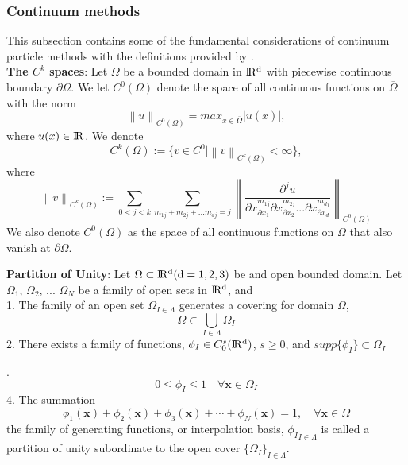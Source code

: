 \documentclass[a4paper,12pt,openany]{book}
\newcommand{\R}{\rm I\!R}
\newcommand{\norm}[1]{\left\lVert#1\right\rVert}
\theoremstyle{break}
\begin{document}
\subsubsection{Continuum methods}
This subsection contains some of the fundamental considerations of continuum particle methods with the definitions provided by \cite{Shaofan2007}. \\

\textbf{The $C^k$ spaces}: Let $\Omega$ be a bounded domain in $\R^d$ with piecewise continuous boundary $\partial\Omega$. We let $C^0(\Omega)$ denote the space of all continuous functions on $\overline{\Omega}$ with the norm
\begin{equation}
\norm{u}_{C^0(\Omega)}=max_{x\in\overline{\Omega}}|u(x)|,
\end{equation}
where $u(x)\in\R$. We denote
\begin{equation}
C^k(\Omega):=\{v\in C^0\vert\norm{v}_{C^k (\Omega)}<\infty\},
\end{equation}
where
\begin{equation}
\norm{v}_{C^k (\Omega)}:=\sum_{0<j<k}\sum_{m_{1j}+m_{2j}+...m_{dj}=j}\norm{\frac{\partial^j u}{\partial x^{m_{1j}}_{\partial x_1}\partial x^{m_{2j}}_{\partial x_2}...\partial x^{m_{dj}}_{\partial x_d}}}_{C^0(\Omega)}
\end{equation}
We also denote $C^0(\Omega)$ as the space of all continuous functions on $\Omega$ that also vanish at $\partial\Omega$.

\textbf{Partition of Unity}: Let $\Omega \subset \R^d(d=1,2,3)$ be and open bounded domain. Let $\Omega_1$, $\Omega_2$, ... $\Omega_{N}$ be a family of open sets in $\R^d$, and \\
1. The family of an open set ${\Omega}_{I\in\Lambda}$ generates a covering for domain $\Omega$,
\begin{equation}
\Omega\subset\bigcup\limits_{I\in \Lambda} \Omega_I
\end{equation}
2. There exists a family of functions, $\phi_I\in C_0^s(\R^d)$, $s\geq 0$, and $supp\{\phi_I\}\subset \overline{\Omega}_I$

.
\begin{equation}
0\leq\phi_I\leq 1 \quad \forall \textbf{x} \in \Omega_I
\end{equation}
4. The summation
\begin{equation}
\phi_1(\textbf{x})+\phi_2(\textbf{x})+\phi_3(\textbf{x})+\cdots+\phi_{N}(\textbf{x})=1, \quad \forall \textbf{x}\in\Omega
\end{equation}
the family of generating functions, or interpolation basis, ${\phi_I}_{I\in\Lambda}$ is called a partition of unity subordinate to the open cover $\{\Omega_I\}_{I\in \Lambda}$.
\end{document}
